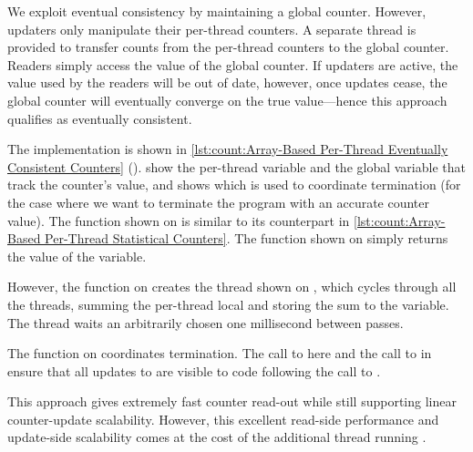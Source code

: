We exploit eventual consistency by maintaining a global counter.
However, updaters only manipulate their per-thread counters.
A separate thread is provided to transfer counts from the per-thread
counters to the global counter.
Readers simply access the value of the global counter.
If updaters are active, the value used by the readers will be out of
date, however, once updates cease, the global counter will eventually
converge on the true value---hence this approach qualifies as
eventually consistent.

\begin{listing}
\caption{Array-Based Per-Thread Eventually Consistent Counters}
\label{lst:count:Array-Based Per-Thread Eventually Consistent Counters}
\end{listing}

\begin{fcvref}
The implementation is shown in
\cref{lst:count:Array-Based Per-Thread Eventually Consistent Counters}
().
show the per-thread variable and the global variable that
track the counter's value, and  shows 
which is used to coordinate termination (for the case where we want
to terminate the program with an accurate counter value).
The  function shown on
 is similar to its
counterpart in
\cref{lst:count:Array-Based Per-Thread Statistical Counters}.
The  function shown on
 simply returns the
value of the  variable.

However, the  function on
creates the  thread shown on
, which
cycles through all the threads,
summing the per-thread local  and storing the
sum to the  variable.
The  thread waits an arbitrarily chosen one millisecond
between passes.

\QuickQuizEnd

The  function on
 coordinates termination.
The call to  here and the call to 
in  ensure that all updates to  are visible
to code following the call to .

This approach gives extremely fast counter read-out while still
supporting linear counter-update scalability.
However, this excellent read-side performance and update-side scalability
comes at the cost of the additional thread running .
\end{fcvref}

